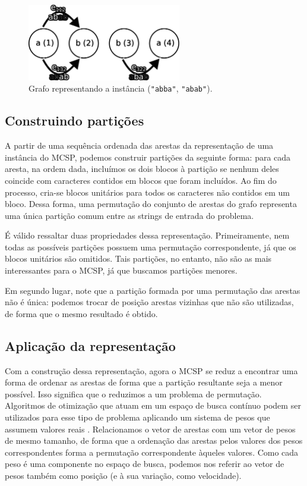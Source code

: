 \begin{figure}
    \centering
    \includegraphics[width=0.6\textwidth]{images/grafo.pdf}
    
    \caption{Grafo representando a instância (\texttt{"abba"}, \texttt{"abab"}).}
    \label{fig:grafo}
\end{figure}

\subsection{Construindo partições}

    A partir de uma sequência ordenada das arestas da representação de uma instância do MCSP, podemos construir partições da seguinte forma: para cada aresta, na ordem dada, incluímos os dois blocos à partição se nenhum deles coincide com caracteres contidos em blocos que foram incluídos. Ao fim do processo, cria-se blocos unitários para todos os caracteres não contidos em um bloco. Dessa forma, uma permutação do conjunto de arestas do grafo representa uma única partição comum entre as strings de entrada do problema.
    
    É válido ressaltar duas propriedades dessa representação. Primeiramente, nem todas as possíveis partições possuem uma permutação correspondente, já que os blocos unitários são omitidos. Tais partições, no entanto, não são as mais interessantes para o MCSP, já que buscamos partições menores.

    Em segundo lugar, note que a partição formada por uma permutação das arestas não é única: podemos trocar de posição arestas vizinhas que não são utilizadas, de forma que o mesmo resultado é obtido.

\subsection{Aplicação da representação}

    Com a construção dessa representação, agora o MCSP se reduz a encontrar uma forma de ordenar as arestas de forma que a partição resultante seja a menor possível. Isso significa que o reduzimos a um problema de permutação. Algoritmos de otimização que atuam em um espaço de busca contínuo podem ser utilizados para esse tipo de problema aplicando um sistema de pesos que assumem valores reais \cite[p.~661]{marti_handbook_2018}. Relacionamos o vetor de arestas com um vetor de pesos de mesmo tamanho, de forma que a ordenação das arestas pelos valores dos pesos correspondentes forma a permutação correspondente àqueles valores. Como cada peso é uma componente no espaço de busca, podemos nos referir ao vetor de pesos também como posição (e à sua variação, como velocidade).
    